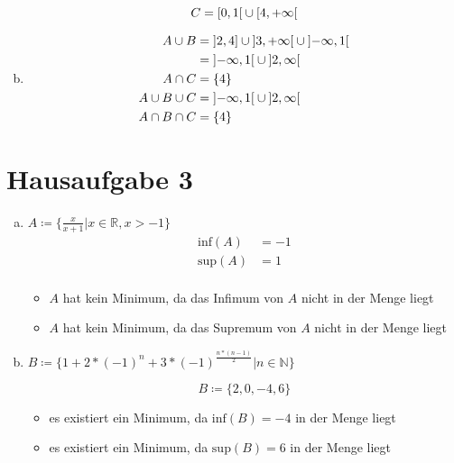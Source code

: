 \documentclass{article}
\begin{document}
\begin{enumerate}[a)]
  \[
    C = \interval[open right]{0}{1} \cup \interval[open right]{4}{+\infty}
  \]

\item
  \begin{align*}
    A \cup B        &= \interval[open left]{2}{4} \cup \interval[open]{3}{+\infty} \cup \interval[open]{-\infty}{1} \\
                    &= \interval[open]{-\infty}{1} \cup \interval[open]{2}{\infty} \\
    A \cap C        &= \{ 4 \} \\
    A \cup B \cup C &= \interval[open]{-\infty}{1} \cup \interval[open]{2}{\infty} \\
    A \cap B \cap C &= \{ 4 \} \\
  \end{align*}
\end{enumerate}

\section*{Hausaufgabe 3}

\begin{enumerate}[a)]
\item $A \coloneqq \{ \frac{x}{x + 1} | x \in \mathbb{R}, x > -1 \}$
  \begin{align*}
    \text{inf}(A) &= -1 \\
    \text{sup}(A) &= 1 \\
  \end{align*}
  \begin{itemize}
  \item $A$ hat kein Minimum, da das Infimum von $A$ nicht in der Menge liegt 
  \item $A$ hat kein Minimum, da das Supremum von $A$ nicht in der Menge liegt 
  \end{itemize}
\item $B \coloneqq \{ 1 + 2 * (-1)^n + 3 * (-1)^{\frac{n*(n - 1)}{2}} | n \in \mathbb{N}\}$

  \[
    B \coloneqq \{ 2, 0, -4, 6 \} 
  \]
  \begin{itemize}
  \item es existiert ein Minimum, da $\text{inf}(B) = -4$ in der Menge liegt 
  \item es existiert ein Minimum, da $\text{sup}(B) = 6$ in der Menge liegt 
  \end{itemize}

\end{enumerate}
\end{document}
